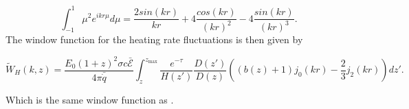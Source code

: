 \documentclass[twocolumns]{emulateapj}
\begin{document}
\begin{equation}
  \label{eq:bes2}
  \int_{-1}^{1}\mu^2 e^{i k r \mu} d\mu=\frac{2 sin(kr)}{kr}+4\frac{cos(kr)}{(kr)^2}-4\frac{sin(kr)}{(kr)^3}.
\end{equation}
The window function for the heating rate fluctuations is then given by 

\begin{equation}
  \label{eq:heat_fluc}
  \tilde{W}_H(k,z)=\frac{E_0(1+z)^2\sigma c \mathcal{\bar{E}}}{4\pi\bar{\dot{q}}}\int_z^{z_{\mathrm{max}}} \frac{e^{-\tau}}{H(z')}\frac{D(z')}{D(z)}\left((b(z)+1)j_0(kr)-\frac{2}{3}j_2(kr)\right)dz'.
\end{equation}

Which is the same window function as  \citet{2007MNRAS.376.1680P,2005ApJ...626....1B}. 





 
\end{document}
